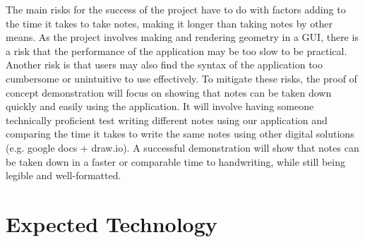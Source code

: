 \documentclass{article}
\begin{document}
{The main risks for the success of the project have to do with factors adding 
to the time it takes to take notes, making it longer than
taking notes by other means. As the project involves making and rendering 
geometry in a GUI, there is a risk that the performance of the 
application may be too slow to be practical. Another risk is that users may 
also find the syntax of the application too cumbersome or 
unintuitive to use effectively. To mitigate these risks, the proof of concept 
demonstration will focus on showing that notes can be taken 
down quickly and easily using the application. It will involve having someone
technically proficient test writing different notes using our 
application and comparing the time it takes to write the same notes using 
other digital solutions (e.g. google docs + draw.io). A successful 
demonstration will show that notes can be taken down in a faster or 
comparable time to handwriting, while still being legible and well-formatted.

\section{Expected Technology}




}
\end{document}
